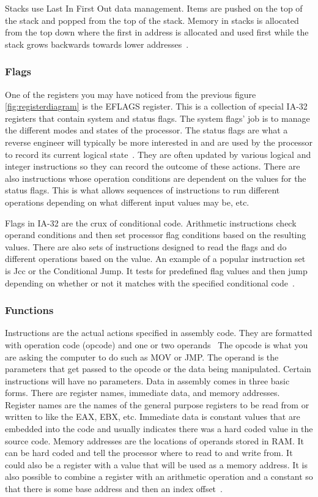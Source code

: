 Stacks use Last In First Out data management. 
Items are pushed on the top of the stack and popped from the top of the stack. 
Memory in stacks is allocated from the top down where the first in address is allocated and used first while the stack grows backwards towards lower addresses~\cite{Reversing}.

\subsubsection{Flags}
One of the registers you may have noticed from the previous figure \ref{fig:registerdiagram} is the EFLAGS register. 
This is a collection of special IA-32 registers that contain system and status flags. 
The system flags’ job is to manage the different modes and states of the processor. 
The status flags are what a reverse engineer will typically be more interested in and are used by the processor to record its current logical state~\cite{Reversing}. 
They are often updated by various logical and integer instructions so they can record the outcome of these actions. 
There are also instructions whose operation conditions are dependent on the values for the status flags. 
This is what allows sequences of instructions to run different operations depending on what different input values may be, etc. 

Flags in IA-32 are the crux of conditional code. 
Arithmetic instructions check operand conditions and then set processor flag conditions based on the resulting values. 
There are also sets of instructions designed to read the flags and do different operations based on the value. 
An example of a popular instruction set is Jcc or the Conditional Jump. 
It tests for predefined flag values and then jump depending on whether or not it matches with the specified conditional code~\cite{intelManual}.

\subsubsection{Functions}
Instructions are the actual actions specified in assembly code. 
They are formatted with operation code (opcode) and one or two operands~\cite{Reversing} 
The opcode is what you are asking the computer to do such as MOV or JMP. 
The operand is the parameters that get passed to the opcode or the data being manipulated. 
Certain instructions will have no parameters. Data in assembly comes in three basic forms. 
There are register names, immediate data, and memory addresses. 
Register names are the names of the general purpose registers to be read from or written to like the EAX, EBX, etc. 
Immediate data is constant values that are embedded into the code and usually indicates there was a hard coded value in the source code. 
Memory addresses are the locations of operands stored in RAM. 
It can be hard coded and tell the processor where to read to and write from. 
It could also be a register with a value that will be used as a memory address. 
It is also possible to combine a register with an arithmetic operation and a constant so that there is some base address and then an index offset~\cite{Reversing}.

